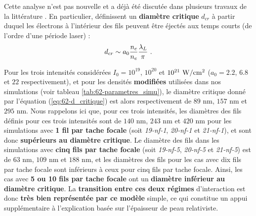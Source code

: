 \begin{refsection}
Cette analyse n'est pas nouvelle et a déjà été discutée dans plusieurs travaux de la littérature \parencite{cristoforetti_2017, huang_2018, lecz_2018, vshivkov_1998b}. En particulier, \cite{lecz_2018} définissent un \textbf{diamètre critique} $d_{cr}$ à partir duquel les électrons à l'intérieur des fils peuvent être éjectés aux temps courts (de l'ordre d'une période laser) :
\begin{equation}
    d_{cr} \sim a_0 \dfrac{n_c}{n_e} \dfrac{\lambda_L}{\pi} ~ \rm .
    \label{eq:62-d_critique}
\end{equation}

Pour les trois intensités considérées $I_0=10^{19}$, $10^{20}$ et $10^{21} ~ \rm W/cm^2$ ($a_0=2.2$, $6.8$ et $22$ respectivement), et pour les densités \textbf{modifiées} utilisées dans nos simulations (voir tableau \ref{tab:62-parametres_simu}), le diamètre critique donné par l'équation (\ref{eq:62-d_critique}) est alors respectivement de $89$ nm, $157$ nm et $295$ nm. Nous rappelons ici que, pour ces trois intensités, les diamètres des fils définis pour ces trois intensités sont de $140$ nm, $243$ nm et $420$ nm pour les simulations avec \textbf{1 fil par tache focale} (soit \textit{19-nf-1}, \textit{20-nf-1} et \textit{21-nf-1}), et sont donc \textbf{supérieurs au diamètre critique}. Le diamètre des fils dans les simulations avec \textbf{cinq fils par tache focale} (soit \textit{19-nf-5}, \textit{20-nf-5} et \textit{21-nf-5}) est de $63$ nm, $109$ nm et $188$ nm, et les diamètres des fils pour les cas avec dix fils par tache focale sont inférieurs à ceux pour cinq fils par tache focale. Ainsi, les cas avec \textbf{5 ou 10 fils par tache focale} ont un \textbf{diamètre inférieur au diamètre critique}. La \textbf{transition entre ces deux régimes} d'interaction est donc \textbf{très bien représentée par ce modèle} simple, ce qui constitue un appui supplémentaire à l'explication basée sur l'épaisseur de peau relativiste.


\end{refsection}
